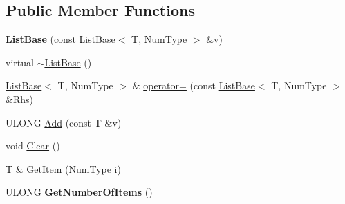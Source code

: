 \subsection*{Public Member Functions}
\begin{DoxyCompactItemize}
\item 
\mbox{\label{class_canberra_1_1_utility_1_1_core_1_1_list_base_aba1876d4b041d1d3efa90d404bb6ba5f}} 
{\bfseries List\+Base} (const \hyperlink{class_canberra_1_1_utility_1_1_core_1_1_list_base}{List\+Base}$<$ T, Num\+Type $>$ \&v)
\item 
virtual \hyperlink{class_canberra_1_1_utility_1_1_core_1_1_list_base_a280204e71e12060a321cc5e12753e65d_a280204e71e12060a321cc5e12753e65d}{$\sim$\+List\+Base} ()
\item 
\hyperlink{class_canberra_1_1_utility_1_1_core_1_1_list_base}{List\+Base}$<$ T, Num\+Type $>$ \& \hyperlink{class_canberra_1_1_utility_1_1_core_1_1_list_base_a56a9f21b1e389b0b057ed3a200130b91_a56a9f21b1e389b0b057ed3a200130b91}{operator=} (const \hyperlink{class_canberra_1_1_utility_1_1_core_1_1_list_base}{List\+Base}$<$ T, Num\+Type $>$ \&Rhs)
\item 
U\+L\+O\+NG \hyperlink{class_canberra_1_1_utility_1_1_core_1_1_list_base_aaacf0eb537ee5765a6929dc4dd42c04b_aaacf0eb537ee5765a6929dc4dd42c04b}{Add} (const T \&v)
\item 
void \hyperlink{class_canberra_1_1_utility_1_1_core_1_1_list_base_ab8431d144c5e017b9e06502549f26833_ab8431d144c5e017b9e06502549f26833}{Clear} ()
\item 
T \& \hyperlink{class_canberra_1_1_utility_1_1_core_1_1_list_base_a2349c775780c9b7441411c96318a6639_a2349c775780c9b7441411c96318a6639}{Get\+Item} (Num\+Type i)
\item 
\mbox{\label{class_canberra_1_1_utility_1_1_core_1_1_list_base_a0385763ebdcfda55e401ba477fb78ed0}} 
U\+L\+O\+NG {\bfseries Get\+Number\+Of\+Items} ()
\end{DoxyCompactItemize}

